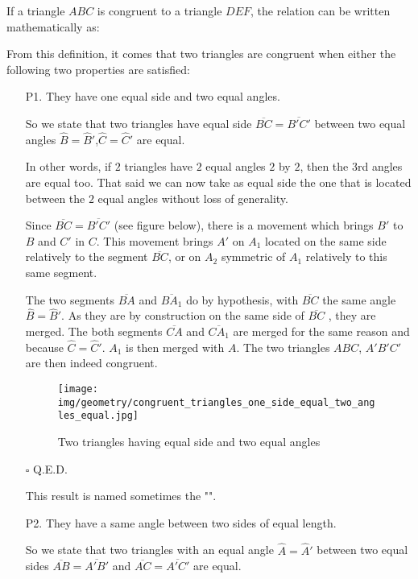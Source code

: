 	If a triangle $ABC$ is congruent to a triangle $DEF$, the relation can be written mathematically as:
	

	From this definition, it comes that two triangles are congruent when either the following two properties are satisfied:
	\begin{enumerate}
		\item[P1.] They have one equal side and two equal angles.
		\begin{dem}
		So we state that two triangles have equal side $\overline{BC} = \overline{B'C'}$ between two equal angles $\hat{B}=\hat{B}'$,$\hat{C}=\hat{C}'$ are equal.
		
		In other words, if $2$ triangles have $2$ equal angles $2$ by $2$, then the $3$rd angles are equal too. That said we can now take as equal side the one that is located between the $2$ equal angles without loss of generality.

	Since $\overline{BC} = \overline{B'C'}$ (see figure below), there is a movement which brings $B'$ to $B$ and $C'$ in $C$. This movement brings $A'$ on $A_1$ located on the same side relatively to the segment $\overline{BC}$, or on $A_2$ symmetric of $A_1$ relatively to this same segment.

	The two segments $\overline{BA}$ and  $\overline{BA_1}$ do by hypothesis, with  $\overline{BC}$  the same angle $\hat{B}=\hat{B}'$. As they are by construction on the same side of  $\overline{BC}$ , they are merged. The both segments  $\overline{CA}$ and $\overline{CA_1}$  are merged for the same reason and because  $\hat{C}=\hat{C}'$. $A_1$ is then merged with $A$. The two triangles $ABC$, $A'B'C'$ are then indeed congruent.
		\begin{figure}[H]
			\centering
			\texttt{[image: img/geometry/congruent\_triangles\_one\_side\_equal\_two\_angles\_equal.jpg]}
			\caption{Two triangles having equal side and two equal angles}
		\end{figure}
		\begin{flushright}
			$\square$  Q.E.D.
		\end{flushright}
		\end{dem}
		This result is named sometimes the "\index{angle-side-angle theorem}".

		\item[P2.] They have a same angle between two sides of equal length.
		\begin{dem}
		So we state that two triangles with an equal angle $\hat{A}=\hat{A}'$ between two equal sides $\overline{AB} = \overline{A'B '}$ and $\overline{AC}= \overline{A'C'}$ are equal.
		

\end{dem}
\end{enumerate}
